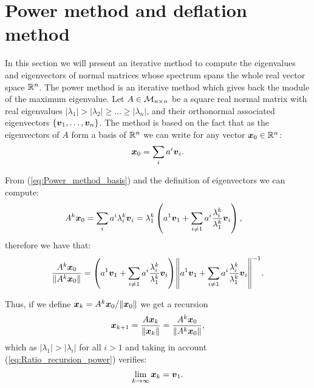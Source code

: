       
     
     \FloatBarrier
 \section{Power method and deflation method}
     In this section we will present an iterative method to compute the eigenvalues and eigenvectors of normal matrices whose spectrum spans the whole real vector space $\mathbb{R}^{n}$. The power method is an iterative method which gives back the module of the maximum eigenvalue. Let $A\in\mathcal{M}_{n \times n}$ be a square real normal matrix
     with real eigenvalues $|\lambda_1|>|\lambda_2|\geq\dots\geq|\lambda_n|$, and their orthonormal associated eigenvectors $\{\boldsymbol{v}_1,\ldots,\boldsymbol{v}_n\}$. The method is based on the fact that as the eigenvectors of $A$ form a basis of $\mathbb{R}^{n}$ we can write for any vector $\boldsymbol{x}_0\in\mathbb{R}^{n}$:
     \begin{align}
     	\boldsymbol{x}_0 
     	=
     	\sum_{i}
     	a^i\boldsymbol{v}_i.
     	\label{eq:Power_method_basis}
     \end{align}
     
     From (\ref{eq:Power_method_basis}) and the definition of eigenvectors we can compute:
     \begin{align*}
     	A^{k}\boldsymbol{x}_0 
     	&
     	= \sum_{i} a^i\lambda_i^{k} \boldsymbol{v}_i
     	=
     	\lambda_1^{k}
     	\left(
     	a^1 \boldsymbol{v}_1
     	+
     	\sum_{i\neq 1} a^i\frac{\lambda_i^{k}}{\lambda_1^{k}} \boldsymbol{v}_i
     	\right)
     	,
     \end{align*}
     therefore we have that:
     \begin{align}
     	\frac
     	{
     		A^{k}\boldsymbol{x}_0 
     	}
     	{
     		\norm
     		{A^{k}\boldsymbol{x}_0 }
     	}
         =
         {
         	\left(
         	a^1 \boldsymbol{v}_1
         	+
         	\sum_{i\neq 1} a^i\frac{\lambda_i^{k}}{\lambda_1^{k}} \boldsymbol{v}_i
         	\right)
         }
         {
         	\norm
         	{a^1 \boldsymbol{v}_1
         	+
         	\sum_{i\neq 1} a^i\frac{\lambda_i^{k}}{\lambda_1^{k}} \boldsymbol{v}_i}
         }^{-1}.
     \label{eq:Ratio_recursion_power}
     \end{align}
     
     Thus, if we define $\boldsymbol{x}_{k}=A^{k}\boldsymbol{x}_0/\norm{\boldsymbol{x}_0}$ we get a recursion
     \begin{align}
     	\boldsymbol{x}_{k+1}
     	=
     	\frac{A\boldsymbol{x}_{k}}{\norm{\boldsymbol{x}_{k}}}
     	=
     	\frac
     	{
     		A^{k}\boldsymbol{x}_0 
     	}
     	{
     		\norm
     		{A^{k}\boldsymbol{x}_0 }
     	},
     \label{eq:Power_method_recursion}
     \end{align}
     which as $|\lambda_1|>|\lambda_i|$ for all $i> 1$ and taking in account (\ref{eq:Ratio_recursion_power}) verifies:
     \begin{align}
     	\lim_{k\rightarrow\infty}\boldsymbol{x}_{k} = \boldsymbol{v}_1.
     	\label{eq:Rayleigh_quotient}
     \end{align}
     
